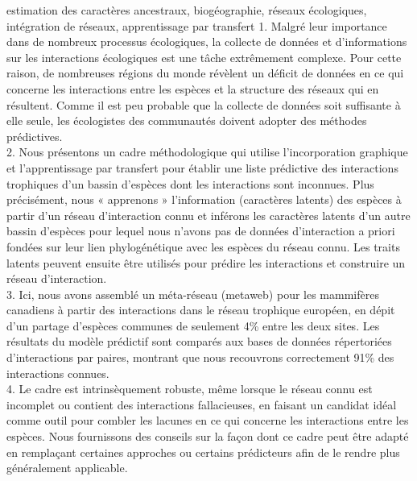 \begin{resume}{estimation des caractères ancestraux, biogéographie, réseaux écologiques, intégration de réseaux, apprentissage par transfert} 1. Malgré leur importance dans de nombreux processus écologiques, la collecte de données et d’informations sur les interactions écologiques est une tâche extrêmement complexe. Pour cette raison, de nombreuses régions du monde révèlent un déficit de données en ce qui concerne les interactions entre les espèces et la structure des réseaux qui en résultent. Comme il est peu probable que la collecte de données soit suffisante à elle seule, les écologistes des communautés doivent adopter des méthodes prédictives.\\
2. Nous présentons un cadre méthodologique qui utilise l’incorporation graphique et l’apprentissage par transfert pour établir une liste prédictive des interactions trophiques d’un bassin d’espèces dont les interactions sont inconnues. Plus précisément, nous « apprenons » l’information (caractères latents) des espèces à partir d’un réseau d’interaction connu et inférons les caractères latents d’un autre bassin d’espèces pour lequel nous n’avons pas de données d’interaction a priori fondées sur leur lien phylogénétique avec les espèces du réseau connu. Les traits latents peuvent ensuite être utilisés pour prédire les interactions et construire un réseau d’interaction.\\
3. Ici, nous avons assemblé un méta-réseau (metaweb) pour les mammifères canadiens à partir des interactions dans le réseau trophique européen, en dépit d’un partage d’espèces communes de seulement 4\% entre les deux sites. Les résultats du modèle prédictif sont comparés aux bases de données répertoriées d’interactions par paires, montrant que nous recouvrons correctement 91\% des interactions connues.\\
4. Le cadre est intrinsèquement robuste, même lorsque le réseau connu est incomplet ou contient des interactions fallacieuses, en faisant un candidat idéal comme outil pour combler les lacunes en ce qui concerne les interactions entre les espèces. Nous fournissons des conseils sur la façon dont ce cadre peut être adapté en remplaçant certaines approches ou certains prédicteurs afin de le rendre plus généralement applicable.\\
\end{resume}

